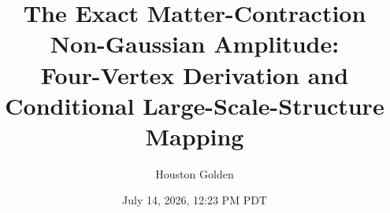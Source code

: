 \documentclass[aps,prd,twocolumn,superscriptaddress,showpacs,preprintnumbers,nofootinbib,longbibliography,floatfix]{revtex4-2}
\begin{document}

\title{The Exact Matter-Contraction Non-Gaussian Amplitude:\\
Four-Vertex Derivation and Conditional Large-Scale-Structure Mapping}

\author{Houston Golden}

\date{July 14, 2026, 12:23 PM PDT}
\end{document}
